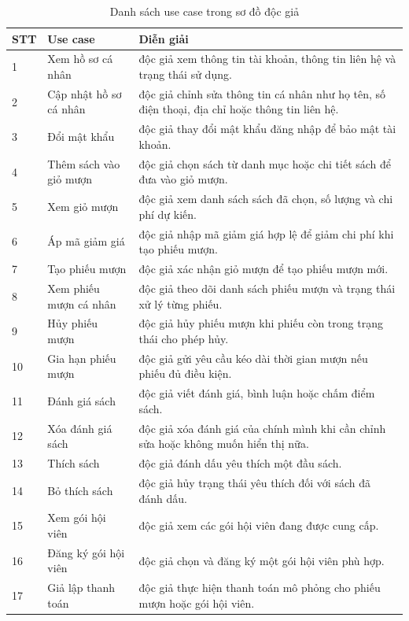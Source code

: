 \documentclass[../main.tex]{subfiles}
\begin{document}
\begin{longtable}{|p{1cm}|p{4cm}|p{8cm}|}
\caption{Danh sách use case trong sơ đồ độc giả}\\
\hline
\textbf{STT} & \textbf{Use case} & \textbf{Diễn giải} \\
\hline
1 & Xem hồ sơ cá nhân & độc giả xem thông tin tài khoản, thông tin liên hệ và trạng thái sử dụng. \\
\hline
2 & Cập nhật hồ sơ cá nhân & độc giả chỉnh sửa thông tin cá nhân như họ tên, số điện thoại, địa chỉ hoặc thông tin liên hệ. \\
\hline
3 & Đổi mật khẩu & độc giả thay đổi mật khẩu đăng nhập để bảo mật tài khoản. \\
\hline
4 & Thêm sách vào giỏ mượn & độc giả chọn sách từ danh mục hoặc chi tiết sách để đưa vào giỏ mượn. \\
\hline
5 & Xem giỏ mượn & độc giả xem danh sách sách đã chọn, số lượng và chi phí dự kiến. \\
\hline
6 & Áp mã giảm giá & độc giả nhập mã giảm giá hợp lệ để giảm chi phí khi tạo phiếu mượn. \\
\hline
7 & Tạo phiếu mượn & độc giả xác nhận giỏ mượn để tạo phiếu mượn mới. \\
\hline
8 & Xem phiếu mượn cá nhân & độc giả theo dõi danh sách phiếu mượn và trạng thái xử lý từng phiếu. \\
\hline
9 & Hủy phiếu mượn & độc giả hủy phiếu mượn khi phiếu còn trong trạng thái cho phép hủy. \\
\hline
10 & Gia hạn phiếu mượn & độc giả gửi yêu cầu kéo dài thời gian mượn nếu phiếu đủ điều kiện. \\
\hline
11 & Đánh giá sách & độc giả viết đánh giá, bình luận hoặc chấm điểm sách. \\
\hline
12 & Xóa đánh giá sách & độc giả xóa đánh giá của chính mình khi cần chỉnh sửa hoặc không muốn hiển thị nữa. \\
\hline
13 & Thích sách & độc giả đánh dấu yêu thích một đầu sách. \\
\hline
14 & Bỏ thích sách & độc giả hủy trạng thái yêu thích đối với sách đã đánh dấu. \\
\hline
15 & Xem gói hội viên & độc giả xem các gói hội viên đang được cung cấp. \\
\hline
16 & Đăng ký gói hội viên & độc giả chọn và đăng ký một gói hội viên phù hợp. \\
\hline
17 & Giả lập thanh toán & độc giả thực hiện thanh toán mô phỏng cho phiếu mượn hoặc gói hội viên. \\

\end{longtable}
\end{document}
